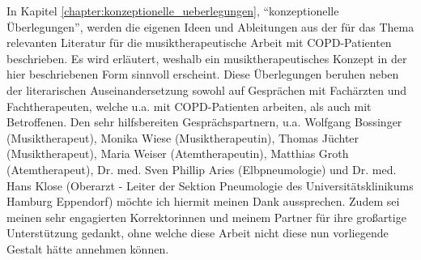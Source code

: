 In Kapitel \ref{chapter:konzeptionelle_ueberlegungen}, "`konzeptionelle Überlegungen"', werden die eigenen Ideen und Ableitungen aus der für das Thema relevanten Literatur für die musiktherapeutische Arbeit mit COPD-Patienten beschrieben. Es wird erläutert, weshalb ein musiktherapeutisches Konzept in der hier beschriebenen Form sinnvoll erscheint. Diese Überlegungen beruhen neben der literarischen Auseinandersetzung sowohl auf Gesprächen mit Fachärzten und Fachtherapeuten, welche u.a. mit COPD-Patienten arbeiten, als auch mit Betroffenen. Den sehr hilfsbereiten Gesprächspartnern, u.a. Wolfgang Bossinger (Musiktherapeut), Monika Wiese (Musiktherapeutin), Thomas Jüchter (Musiktherapeut), Maria Weiser (Atemtherapeutin), Matthias Groth (Atemtherapeut), Dr. med. Sven Phillip Aries (Elbpneumologie) und Dr. med. Hans Klose (Oberarzt - Leiter der Sektion Pneumologie des Universitätsklinikums Hamburg Eppendorf) möchte ich hiermit meinen Dank aussprechen. Zudem sei meinen sehr engagierten Korrektorinnen und meinem Partner für ihre großartige Unterstützung gedankt, ohne welche diese Arbeit nicht diese nun vorliegende Gestalt hätte annehmen können.

\newpage\thispagestyle{empty}